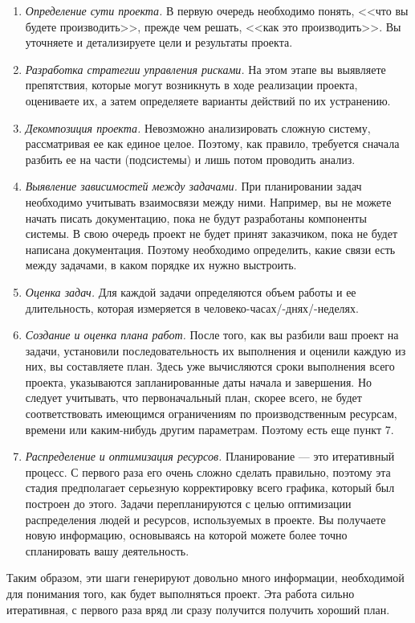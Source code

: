 \documentclass{../../text-style}
\begin{document}
\begin{enumerate}
    \item \emph{Определение сути проекта.} В первую очередь необходимо понять, <<что вы будете производить>>, прежде чем решать, <<как это производить>>. Вы уточняете и детализируете цели и результаты проекта.
    \item \emph{Разработка стратегии управления рисками.} На этом этапе вы выявляете препятствия, которые могут возникнуть в ходе реализации проекта, оцениваете их, а затем определяете варианты действий по их устранению.
    \item \emph{Декомпозиция проекта.} Невозможно анализировать сложную систему, рассматривая ее как единое целое. Поэтому, как правило, требуется сначала разбить ее на части (подсистемы) и лишь потом проводить анализ.
    \item \emph{Выявление зависимостей между задачами.} При планировании задач необходимо учитывать взаимосвязи между ними. Например, вы не можете начать писать документацию, пока не будут разработаны компоненты системы. В свою очередь проект не будет принят заказчиком, пока не будет написана документация. Поэтому необходимо определить, какие связи есть между задачами, в каком порядке их нужно выстроить.
    \item \emph{Оценка задач.} Для каждой задачи определяются объем работы и ее длительность, которая измеряется в человеко-часах/-днях/-неделях.
    \item \emph{Создание и оценка плана работ.} После того, как вы разбили ваш проект на задачи, установили последовательность их выполнения и оценили каждую из них, вы составляете план. Здесь уже вычисляются сроки выполнения всего проекта, указываются запланированные даты начала и завершения. Но следует учитывать, что первоначальный план, скорее всего, не будет соответствовать имеющимся ограничениям по производственным ресурсам, времени или каким-нибудь другим параметрам. Поэтому есть еще пункт 7.
    \item \emph{Распределение и оптимизация ресурсов.} Планирование --- это итеративный процесс. С первого раза его очень сложно сделать правильно, поэтому эта стадия предполагает серьезную корректировку всего графика, который был построен до этого. Задачи перепланируются с целью оптимизации распределения людей и ресурсов, используемых в проекте. Вы получаете новую информацию, основываясь на которой можете более точно спланировать вашу деятельность.
\end{enumerate}

Таким образом, эти шаги генерируют довольно много информации, необходимой для понимания того, как будет выполняться проект. Эта работа сильно итеративная, с первого раза вряд ли сразу получится получить хороший план.
\end{document}
